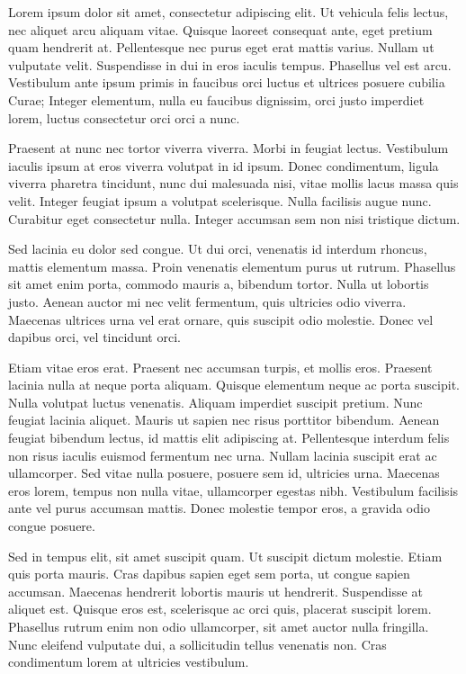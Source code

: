 \documentclass[12pt,twoside=false,a4paper,parskip]{scrbook}
\begin{document}
Lorem \cite{gamageLabelingSyntheticContent2025} ipsum dolor sit amet, consectetur adipiscing elit. Ut vehicula felis lectus, nec aliquet arcu aliquam vitae. Quisque laoreet consequat ante, eget pretium quam hendrerit at. Pellentesque nec purus eget erat mattis varius. Nullam ut vulputate velit. Suspendisse in dui in eros iaculis tempus. Phasellus vel est arcu. Vestibulum ante ipsum primis in faucibus orci luctus et ultrices posuere cubilia Curae; Integer elementum, nulla eu faucibus dignissim, orci justo imperdiet lorem, luctus consectetur orci orci a nunc.

Praesent at nunc nec tortor viverra viverra. Morbi in feugiat lectus. Vestibulum iaculis ipsum at eros viverra volutpat in id ipsum. Donec condimentum, ligula viverra pharetra tincidunt, nunc dui malesuada nisi, vitae mollis lacus massa quis velit. Integer feugiat ipsum a volutpat scelerisque. Nulla facilisis augue nunc. Curabitur eget consectetur nulla. Integer accumsan sem non nisi tristique dictum.

Sed lacinia eu dolor sed congue. Ut dui orci, venenatis id interdum rhoncus, mattis elementum massa. Proin venenatis elementum purus ut rutrum. Phasellus sit amet enim porta, commodo mauris a, bibendum tortor. Nulla ut lobortis justo. Aenean auctor mi nec velit fermentum, quis ultricies odio viverra. Maecenas ultrices urna vel erat ornare, quis suscipit odio molestie. Donec vel dapibus orci, vel tincidunt orci.

Etiam vitae eros erat. Praesent nec accumsan turpis, et mollis eros. Praesent lacinia nulla at neque porta aliquam. Quisque elementum neque ac porta suscipit. Nulla volutpat luctus venenatis. Aliquam imperdiet suscipit pretium. Nunc feugiat lacinia aliquet. Mauris ut sapien nec risus porttitor bibendum. Aenean feugiat bibendum lectus, id mattis elit adipiscing at. Pellentesque interdum felis non risus iaculis euismod fermentum nec urna. Nullam lacinia suscipit erat ac ullamcorper. Sed vitae nulla posuere, posuere sem id, ultricies urna. Maecenas eros lorem, tempus non nulla vitae, ullamcorper egestas nibh. Vestibulum facilisis ante vel purus accumsan mattis. Donec molestie tempor eros, a gravida odio congue posuere.

Sed in tempus elit, sit amet suscipit quam. Ut suscipit dictum molestie. Etiam quis porta mauris. Cras dapibus sapien eget sem porta, ut congue sapien accumsan. Maecenas hendrerit lobortis mauris ut hendrerit. Suspendisse at aliquet est. Quisque eros est, scelerisque ac orci quis, placerat suscipit lorem. Phasellus rutrum enim non odio ullamcorper, sit amet auctor nulla fringilla. Nunc eleifend vulputate dui, a sollicitudin tellus venenatis non. Cras condimentum lorem at ultricies vestibulum.
\end{document}
